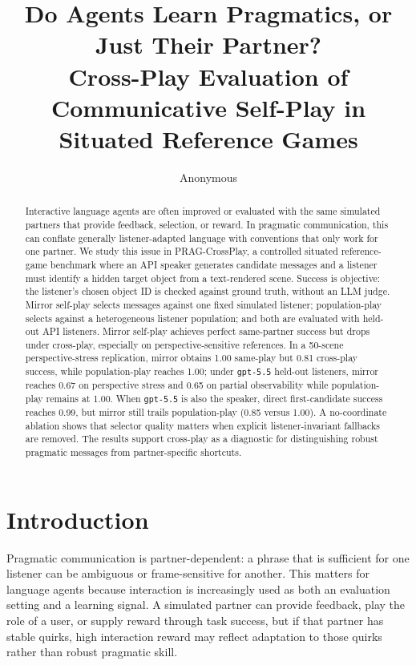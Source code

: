 \documentclass[10pt]{article}
\title{Do Agents Learn Pragmatics, or Just Their Partner?\\
\large Cross-Play Evaluation of Communicative Self-Play in Situated Reference Games}
\author{Anonymous}
\date{}
\begin{document}
\maketitle

\begin{abstract}
Interactive language agents are often improved or evaluated with the same simulated partners that provide feedback, selection, or reward. In pragmatic communication, this can conflate generally listener-adapted language with conventions that only work for one partner. We study this issue in PRAG-CrossPlay, a controlled situated reference-game benchmark where an API speaker generates candidate messages and a listener must identify a hidden target object from a text-rendered scene. Success is objective: the listener's chosen object ID is checked against ground truth, without an LLM judge. Mirror self-play selects messages against one fixed simulated listener; population-play selects against a heterogeneous listener population; and both are evaluated with held-out API listeners. Mirror self-play achieves perfect same-partner success but drops under cross-play, especially on perspective-sensitive references. In a 50-scene perspective-stress replication, mirror obtains 1.00 same-play but 0.81 cross-play success, while population-play reaches 1.00; under \texttt{gpt-5.5} held-out listeners, mirror reaches 0.67 on perspective stress and 0.65 on partial observability while population-play remains at 1.00. When \texttt{gpt-5.5} is also the speaker, direct first-candidate success reaches 0.99, but mirror still trails population-play (0.85 versus 1.00). A no-coordinate ablation shows that selector quality matters when explicit listener-invariant fallbacks are removed. The results support cross-play as a diagnostic for distinguishing robust pragmatic messages from partner-specific shortcuts.
\end{abstract}

\section{Introduction}

Pragmatic communication is partner-dependent: a phrase that is sufficient for one listener can be ambiguous or frame-sensitive for another. This matters for language agents because interaction is increasingly used as both an evaluation setting and a learning signal. A simulated partner can provide feedback, play the role of a user, or supply reward through task success, but if that partner has stable quirks, high interaction reward may reflect adaptation to those quirks rather than robust pragmatic skill.
\end{document}
